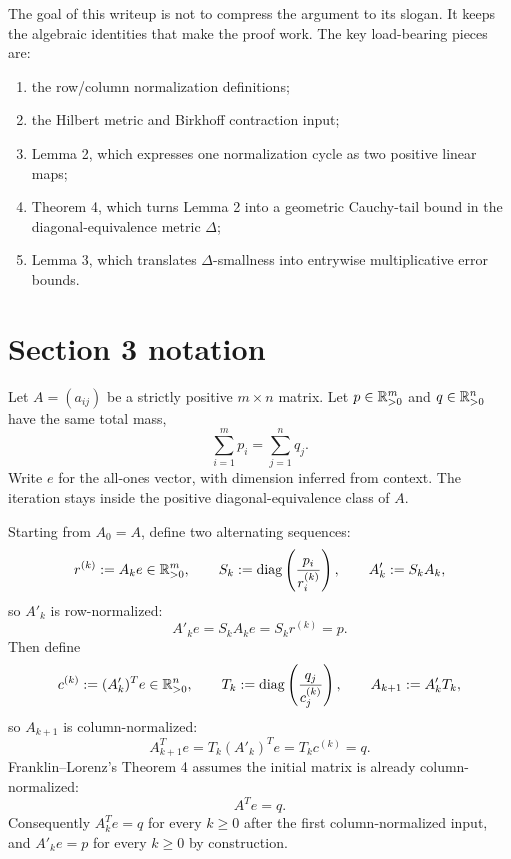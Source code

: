 The goal of this writeup is not to compress the argument to its slogan.  It keeps
the algebraic identities that make the proof work.  The key load-bearing pieces are:
\begin{enumerate}[leftmargin=2em]
\item the row/column normalization definitions;
\item the Hilbert metric and Birkhoff contraction input;
\item Lemma 2, which expresses one normalization cycle as two positive linear maps;
\item Theorem 4, which turns Lemma 2 into a geometric Cauchy-tail bound in the
      diagonal-equivalence metric $\Delta$;
\item Lemma 3, which translates $\Delta$-smallness into entrywise multiplicative
      error bounds.
\end{enumerate}

\section*{Section 3 notation}
Let $A=(a_{ij})$ be a strictly positive $m\times n$ matrix.  Let
$p\in\mathbb{R}^m_{>0}$ and $q\in\mathbb{R}^n_{>0}$ have the same total mass,
\[
  \sum_{i=1}^m p_i = \sum_{j=1}^n q_j.
\]
Write $e$ for the all-ones vector, with dimension inferred from context.  The
iteration stays inside the positive diagonal-equivalence class of $A$.

Starting from $A_0=A$, define two alternating sequences:
\[
  r^{(k)} := A_k e \in \mathbb{R}^m_{>0},
  \qquad
  S_k := \operatorname{diag}\left(\frac{p_i}{r_i^{(k)}}\right),
  \qquad
  A'_k := S_k A_k,
\]
so $A'_k$ is row-normalized:
\[
  A'_k e = S_k A_k e = S_k r^{(k)} = p.
\]
Then define
\[
  c^{(k)} := (A'_k)^T e \in \mathbb{R}^n_{>0},
  \qquad
  T_k := \operatorname{diag}\left(\frac{q_j}{c_j^{(k)}}\right),
  \qquad
  A_{k+1} := A'_k T_k,
\]
so $A_{k+1}$ is column-normalized:
\[
  A_{k+1}^T e = T_k (A'_k)^T e = T_k c^{(k)} = q.
\]
Franklin--Lorenz's Theorem 4 assumes the initial matrix is already column-normalized:
\[
  A^T e=q.
\]
Consequently $A_k^T e=q$ for every $k\ge 0$ after the first column-normalized input,
and $A'_k e=p$ for every $k\ge 0$ by construction.

